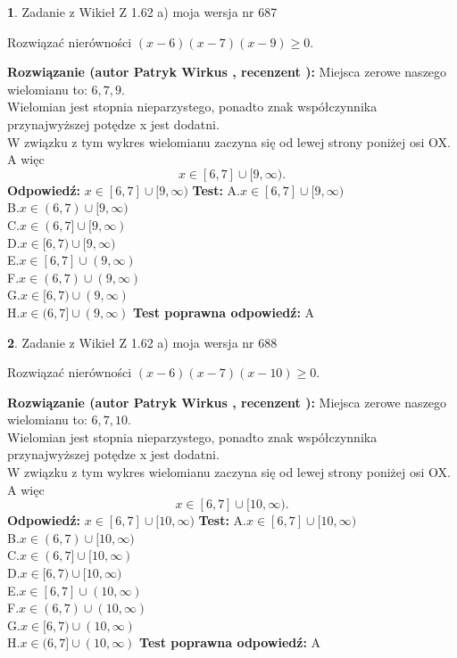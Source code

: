 \documentclass[12pt, a4paper]{article}
\theoremstyle{definition} %
\newtheorem{zad}{}
\newcommand{\zadStart}[1]{\begin{zad}#1\newline}
\newcommand{\zadStop}{\end{zad}}
\newcommand{\rozwStart}[2]{\noindent \textbf{Rozwiązanie (autor #1 , recenzent #2): }\newline}
\newcommand{\rozwStop}{\newline}
\newcommand{\odpStart}{\noindent \textbf{Odpowiedź:}\newline}
\newcommand{\odpStop}{\newline}
\newcommand{\testStart}{\noindent \textbf{Test:}\newline}
\newcommand{\testStop}{\newline}
\newcommand{\kluczStart}{\noindent \textbf{Test poprawna odpowiedź:}\newline}
\newcommand{\kluczStop}{\newline}
\begin{document}
\zadStart{Zadanie z Wikieł Z 1.62 a) moja wersja nr 687}

Rozwiązać nierówności $(x-6)(x-7)(x-9)\ge0$.
\zadStop
\rozwStart{Patryk Wirkus}{}
Miejsca zerowe naszego wielomianu to: $6, 7, 9$.\\
Wielomian jest stopnia nieparzystego, ponadto znak współczynnika przy\linebreak najwyższej potędze x jest dodatni.\\ W związku z tym wykres wielomianu zaczyna się od lewej strony poniżej osi OX. A więc $$x \in [6,7] \cup [9,\infty).$$
\rozwStop
\odpStart
$x \in [6,7] \cup [9,\infty)$
\odpStop
\testStart
A.$x \in [6,7] \cup [9,\infty)$\\
B.$x \in (6,7) \cup [9,\infty)$\\
C.$x \in (6,7] \cup [9,\infty)$\\
D.$x \in [6,7) \cup [9,\infty)$\\
E.$x \in [6,7] \cup (9,\infty)$\\
F.$x \in (6,7) \cup (9,\infty)$\\
G.$x \in [6,7) \cup (9,\infty)$\\
H.$x \in (6,7] \cup (9,\infty)$
\testStop
\kluczStart
A
\kluczStop



\zadStart{Zadanie z Wikieł Z 1.62 a) moja wersja nr 688}

Rozwiązać nierówności $(x-6)(x-7)(x-10)\ge0$.
\zadStop
\rozwStart{Patryk Wirkus}{}
Miejsca zerowe naszego wielomianu to: $6, 7, 10$.\\
Wielomian jest stopnia nieparzystego, ponadto znak współczynnika przy\linebreak najwyższej potędze x jest dodatni.\\ W związku z tym wykres wielomianu zaczyna się od lewej strony poniżej osi OX. A więc $$x \in [6,7] \cup [10,\infty).$$
\rozwStop
\odpStart
$x \in [6,7] \cup [10,\infty)$
\odpStop
\testStart
A.$x \in [6,7] \cup [10,\infty)$\\
B.$x \in (6,7) \cup [10,\infty)$\\
C.$x \in (6,7] \cup [10,\infty)$\\
D.$x \in [6,7) \cup [10,\infty)$\\
E.$x \in [6,7] \cup (10,\infty)$\\
F.$x \in (6,7) \cup (10,\infty)$\\
G.$x \in [6,7) \cup (10,\infty)$\\
H.$x \in (6,7] \cup (10,\infty)$
\testStop
\kluczStart
A
\kluczStop
\end{document}
